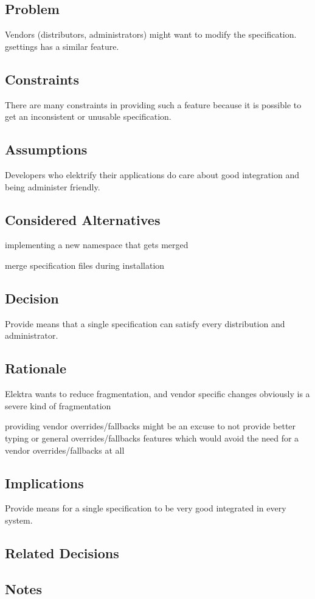 \subsection*{Problem}

Vendors (distributors, administrators) might want to modify the specification. gsettings has a similar feature.

\subsection*{Constraints}

There are many constraints in providing such a feature because it is possible to get an inconsistent or unusable specification.

\subsection*{Assumptions}

Developers who elektrify their applications do care about good integration and being administer friendly.

\subsection*{Considered Alternatives}


\begin{DoxyItemize}
\item implementing a new namespace that gets merged
\item merge specification files during installation
\end{DoxyItemize}

\subsection*{Decision}

Provide means that a single specification can satisfy every distribution and administrator.

\subsection*{Rationale}


\begin{DoxyItemize}
\item Elektra wants to reduce fragmentation, and vendor specific changes obviously is a severe kind of fragmentation
\item providing vendor overrides/fallbacks might be an excuse to not provide better typing or general overrides/fallbacks features which would avoid the need for a vendor overrides/fallbacks at all
\end{DoxyItemize}

\subsection*{Implications}

Provide means for a single specification to be very good integrated in every system.

\subsection*{Related Decisions}

\subsection*{Notes}